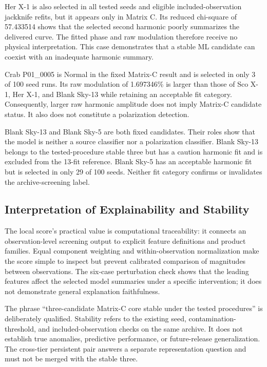 \documentclass[conference]{IEEEtran}
\begin{document}
Her X-1 is also selected in all tested seeds and eligible included-observation jackknife refits, but it appears only in Matrix C. Its reduced chi-square of 57.433514 shows that the selected second harmonic poorly summarizes the delivered curve. The fitted phase and raw modulation therefore receive no physical interpretation. This case demonstrates that a stable ML candidate can coexist with an inadequate harmonic summary.


Crab P01\_0005 is Normal in the fixed Matrix-C result and is selected in only 3 of 100 seed runs. Its raw modulation of 1.697346\% is larger than those of Sco X-1, Her X-1, and Blank Sky-13 while retaining an acceptable fit category. Consequently, larger raw harmonic amplitude does not imply Matrix-C candidate status. It also does not constitute a polarization detection.


Blank Sky-13 and Blank Sky-5 are both fixed candidates. Their roles show that the model is neither a source classifier nor a polarization classifier. Blank Sky-13 belongs to the tested-procedure stable three but has a caution harmonic fit and is excluded from the 13-fit reference. Blank Sky-5 has an acceptable harmonic fit but is selected in only 29 of 100 seeds. Neither fit category confirms or invalidates the archive-screening label.


\subsection{Interpretation of Explainability and Stability}

The local score's practical value is computational traceability: it connects an observation-level screening output to explicit feature definitions and product families. Equal component weighting and within-observation normalization make the score simple to inspect but prevent calibrated comparison of magnitudes between observations. The six-case perturbation check shows that the leading features affect the selected model summaries under a specific intervention; it does not demonstrate general explanation faithfulness.


The phrase ``three-candidate Matrix-C core stable under the tested procedures'' is deliberately qualified. Stability refers to the existing seed, contamination-threshold, and included-observation checks on the same archive. It does not establish true anomalies, predictive performance, or future-release generalization. The cross-tier persistent pair answers a separate representation question and must not be merged with the stable three.
\end{document}
